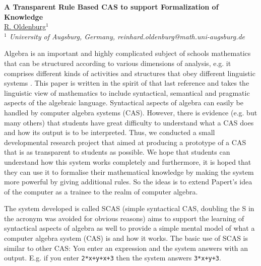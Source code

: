 \documentclass[11pt]{article}
\begin{document}
%
\vspace{-0.8cm}
\begin{flushleft}
\Large \textbf{\noindent
A Transparent Rule Based CAS to support Formalization of Knowledge}
\\
\vspace{0.5cm}
\normalsize
\normalsize{
 \underline{R. Oldenburg}$^1$
} \\
\vspace{5mm}
\textit{\footnotesize
$^1$ University of Augsburg, Germany,
reinhard.oldenburg@math.uni-augsburg.de\\
}
\end{flushleft}


Algebra is an important and highly complicated subject of schools mathematics that can be structured according to various dimensions of analysis, e.g. it comprises different kinds of activities \cite{Ki} and structures that obey different linguistic systems \cite{HKO}. This paper is written in the spirit of that last reference and takes the linguistic view of mathematics to include syntactical, semantical and pragmatic aspects of the algebraic language. Syntactical aspects of algebra can easily be handled by computer algebra systems (CAS). However, there is evidence (e.g. \cite{OW} but many others) that students have great difficulty to understand what a CAS does and how its output is to be interpreted. Thus, we conducted a small developmental research project that aimed at producing a prototype of a CAS that is as transparent to students as possible. We hope that students can understand how this system works completely and furthermore, it is hoped that they can use it to formalise their mathematical knowledge by making the system more powerful by giving additional rules. So the ideas is to extend Papert's idea of the computer as a trainee to the realm of computer algebra. 
 
The system developed is called SCAS (simple syntactical CAS, doubling the S in the acronym was avoided for obvious reasons) aims to support the learning of syntactical aspects of algebra as well to provide a simple mental model of what a computer algebra system (CAS) is and how it works. 
The basic use of SCAS is similar to other CAS: You enter an expression and the system answers with an output. E.g. if you enter \texttt{2*x+y+x+3} then the system answers 	\texttt{3*x+y+3}. 
\end{document}
